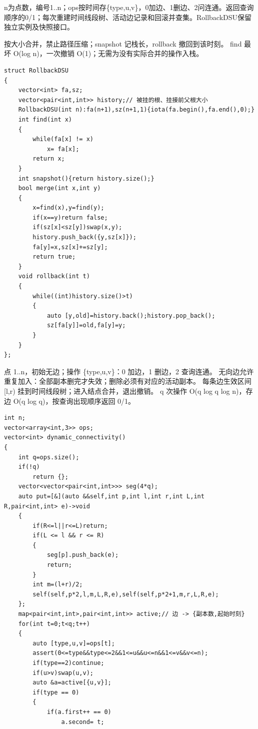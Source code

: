 \documentclass[UTF8,fontset=fandol,a4paper,twoside]{ctexart}
\newcommand{\note}[1]{{\fontsize{10}{12}\selectfont #1\par}}
\begin{document}
\begin{multicols}{2}
\note{n为点数，编号1.\allowbreak{}.\allowbreak{}n；ops按时间存\{type,\allowbreak{}u,\allowbreak{}v\}，0加边、1删边、2问连通。返回查询顺序的0/\allowbreak{}1；每次重建时间线段树、活动边记录和回滚并查集。RollbackDSU保留独立实例及快照接口。}
\note{按大小合并，禁止路径压缩；snapshot 记栈长，rollback 撤回到该时刻。 find 最坏 O(\allowbreak{}log n)\allowbreak{}，一次撤销 O(\allowbreak{}1)\allowbreak{}；无需为没有实际合并的操作入栈。}
\begin{lstlisting}
struct RollbackDSU
{
    vector<int> fa,sz;
    vector<pair<int,int>> history;// 被挂的根、挂接前父根大小
    RollbackDSU(int n):fa(n+1),sz(n+1,1){iota(fa.begin(),fa.end(),0);}
    int find(int x)
    {
        while(fa[x] != x)
            x= fa[x];
        return x;
    }
    int snapshot(){return history.size();}
    bool merge(int x,int y)
    {
        x=find(x),y=find(y);
        if(x==y)return false;
        if(sz[x]<sz[y])swap(x,y);
        history.push_back({y,sz[x]});
        fa[y]=x,sz[x]+=sz[y];
        return true;
    }
    void rollback(int t)
    {
        while((int)history.size()>t)
        {
            auto [y,old]=history.back();history.pop_back();
            sz[fa[y]]=old,fa[y]=y;
        }
    }
};
\end{lstlisting}
\note{点 1.\allowbreak{}.\allowbreak{}n，初始无边；操作 \{type,\allowbreak{}u,\allowbreak{}v\}：0 加边，1 删边，2 查询连通。 无向边允许重复加入：全部副本删完才失效；删除必须有对应的活动副本。 每条边生效区间 [\allowbreak{}l,\allowbreak{}r)\allowbreak{} 挂到时间线段树；进入结点合并，退出撤销。 q 次操作 O(\allowbreak{}q log q log n)\allowbreak{}，存边 O(\allowbreak{}q log q)\allowbreak{}，按查询出现顺序返回 0/\allowbreak{}1。}
\begin{lstlisting}
int n;
vector<array<int,3>> ops;
vector<int> dynamic_connectivity()
{
    int q=ops.size();
    if(!q)
        return {};
    vector<vector<pair<int,int>>> seg(4*q);
    auto put=[&](auto &&self,int p,int l,int r,int L,int R,pair<int,int> e)->void
    {
        if(R<=l||r<=L)return;
        if(L <= l && r <= R)
        {
            seg[p].push_back(e);
            return;
        }
        int m=(l+r)/2;
        self(self,p*2,l,m,L,R,e),self(self,p*2+1,m,r,L,R,e);
    };
    map<pair<int,int>,pair<int,int>> active;// 边 -> {副本数,起始时刻}
    for(int t=0;t<q;t++)
    {
        auto [type,u,v]=ops[t];
        assert(0<=type&&type<=2&&1<=u&&u<=n&&1<=v&&v<=n);
        if(type==2)continue;
        if(u>v)swap(u,v);
        auto &a=active[{u,v}];
        if(type == 0)
        {
            if(a.first++ == 0)
                a.second= t;

\end{lstlisting}
\end{multicols}
\end{document}

